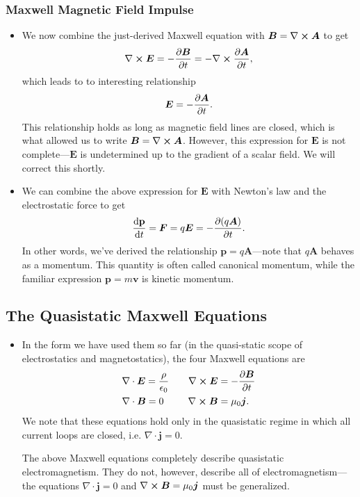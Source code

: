 \documentclass[11pt, a4paper]{article}
\renewcommand{\vec}[1]{\bm{#1}} %
\newcommand{\mat}[1]{\mathbf{#1}} %
\newcommand{\E}{\vec{E}} %
\newcommand{\B}{\vec{B}} %
\newcommand{\A}{\vec{A}} %
\newcommand{\ee}{\epsilon_{0}}  %
\newcommand{\mm}{\mu_{0}}  %
\renewcommand{\j}{\vec{j}}  %
\renewcommand{\div}{\nabla \cdot}
\renewcommand{\curl}{\nabla \cross}
\begin{document}
\subsubsection{Maxwell Magnetic Field Impulse}
\begin{itemize}
	\item We now combine the just-derived Maxwell equation with $ \B = \curl \A $ to get
	\begin{equation*}
		\curl \E = - \pdv{\B}{t} = - \curl \pdv{\A}{t},
	\end{equation*}
	which leads to to interesting relationship
	\begin{equation*}
		\E = - \pdv{\A}{t}.
	\end{equation*}
	This relationship holds as long as magnetic field lines are closed, which is what allowed us to write $ \B = \curl \A $. However, this expression for $ \E $ is not complete---$ \E $ is undetermined up to the gradient of a scalar field. We will correct this shortly.
	
	\item We can combine the above expression for $ \E $ with Newton's law and the electrostatic force to get
	\begin{equation*}
		\dv{\mat{p}}{t} = \vec{F} = q \E = - \pdv{(q \A)}{t}.
	\end{equation*} 
    In other words, we've derived the relationship $ \vec{p} = q \A $---note that $ q\A $ behaves as a momentum. This quantity is often called canonical momentum, while the familiar expression $ \vec{p} = m \vec{v} $ is kinetic momentum.
	
\end{itemize}

\subsection{The Quasistatic Maxwell Equations}
\begin{itemize}
	\item In the form we have used them so far (in the quasi-static scope of electrostatics and magnetostatics), the four Maxwell equations are
	\begin{align*}
		&\div \E = \frac{\rho}{\ee} \qquad \curl \E = - \pdv{\B}{t}\\
		& \div \B = 0 \ \, \qquad \curl \B = \mm \j.
	\end{align*}
	We note that these equations hold only in the quasistatic regime in which all current loops are closed, i.e. $ \div \j = 0 $. 
	
	The above Maxwell equations completely describe quasistatic electromagnetism. They do not, however, describe all of electromagnetism---the equations $ \div \j = 0 $ and $ \curl \B = \mm \j  $ must be generalized.
\end{itemize}
\end{document}

